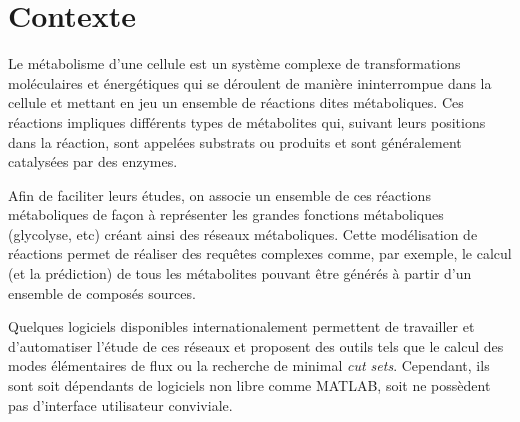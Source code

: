 \chapter{Contexte}
Le métabolisme d'une cellule est un système complexe de transformations moléculaires et énergétiques qui se déroulent 
de manière ininterrompue dans la cellule et mettant en jeu un ensemble de réactions dites métaboliques. 
Ces réactions impliques différents types de métabolites qui, suivant leurs positions dans la réaction, sont appelées substrats 
ou produits et sont généralement catalysées par des enzymes.

Afin de faciliter leurs études, on associe un ensemble de ces réactions métaboliques de façon à représenter les grandes 
fonctions métaboliques (glycolyse, etc) créant ainsi des réseaux métaboliques. Cette modélisation de réactions permet 
de réaliser des requêtes complexes comme, par exemple, le calcul (et la prédiction) de tous les métabolites pouvant 
être générés à partir d’un ensemble de composés sources.

Quelques logiciels disponibles internationalement permettent de travailler et d'automatiser l'étude de ces réseaux et proposent 
des outils tels que le calcul des modes élémentaires de flux ou la recherche de minimal \textit{cut sets}. 
Cependant, ils sont soit dépendants de logiciels non libre comme MATLAB, soit ne possèdent pas d'interface utilisateur conviviale.\\
